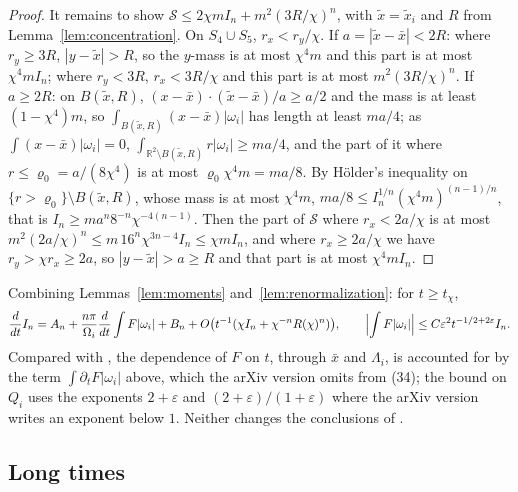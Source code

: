 \documentclass[11pt]{article}
\theoremstyle{definition}
\newcommand{\R}{\mathbb{R}}
\begin{document}
\begin{proof}
It remains to show $\mathcal S \le 2\chi mI_n + m^2(3R/\chi)^n$, with $\tilde x = \tilde x_i$ and $R$ from Lemma~\ref{lem:concentration}. On $S_4\cup S_5$, $r_x < r_y/\chi$. If $a = |\tilde x - \bar x| < 2R$: where $r_y \ge 3R$, $|y - \tilde x| > R$, so the $y$-mass is at most $\chi^4m$ and this part is at most $\chi^4mI_n$; where $r_y < 3R$, $r_x < 3R/\chi$ and this part is at most $m^2(3R/\chi)^n$. If $a \ge 2R$: on $B(\tilde x, R)$, $(x - \bar x)\cdot(\tilde x - \bar x)/a \ge a/2$ and the mass is at least $(1 - \chi^4)m$, so $\int_{B(\tilde x, R)}(x - \bar x)|\omega_i| $ has length at least $ma/4$; as $\int(x - \bar x)|\omega_i| = 0$, $\int_{\R^2\setminus B(\tilde x, R)}r|\omega_i| \ge ma/4$, and the part of it where $r \le \varrho_0 = a/(8\chi^4)$ is at most $\varrho_0\chi^4m = ma/8$. By H\"older's inequality on $\{r > \varrho_0\}\setminus B(\tilde x, R)$, whose mass is at most $\chi^4m$, $ma/8 \le I_n^{1/n}(\chi^4m)^{(n-1)/n}$, that is $I_n \ge ma^n8^{-n}\chi^{-4(n-1)}$. Then the part of $\mathcal S$ where $r_x < 2a/\chi$ is at most $m^2(2a/\chi)^n \le m\,16^n\chi^{3n-4}I_n \le \chi mI_n$, and where $r_x \ge 2a/\chi$ we have $r_y > \chi r_x \ge 2a$, so $|y - \tilde x| > a \ge R$ and that part is at most $\chi^4mI_n$.
\end{proof}

Combining Lemmas~\ref{lem:moments} and~\ref{lem:renormalization}: for $t \ge t_\chi$,
\begin{equation}\label{eq:renormalized}
  \frac{d}{dt}I_n = A_n + \frac{n\pi}{\Omega_i}\frac{d}{dt}\int F|\omega_i| + B_n + O\bigl(t^{-1}(\chi I_n + \chi^{-n}R(\chi)^n)\bigr),
  \qquad \Bigl|\int F|\omega_i|\Bigr| \le C\varepsilon^2t^{-1/2+2\varepsilon}I_n.
\end{equation}
Compared with \cite[(12)--(14)]{zbarsky2021}, the dependence of $F$ on $t$, through $\bar x$ and $\Lambda_i$, is accounted for by the term $\int\partial_tF|\omega_i|$ above, which the arXiv version omits from (34); the bound on $Q_i$ uses the exponents $2 + \varepsilon$ and $(2+\varepsilon)/(1+\varepsilon)$ where the arXiv version writes an exponent below $1$. Neither changes the conclusions of \cite{zbarsky2021}.

\subsection{Long times}
\end{document}
